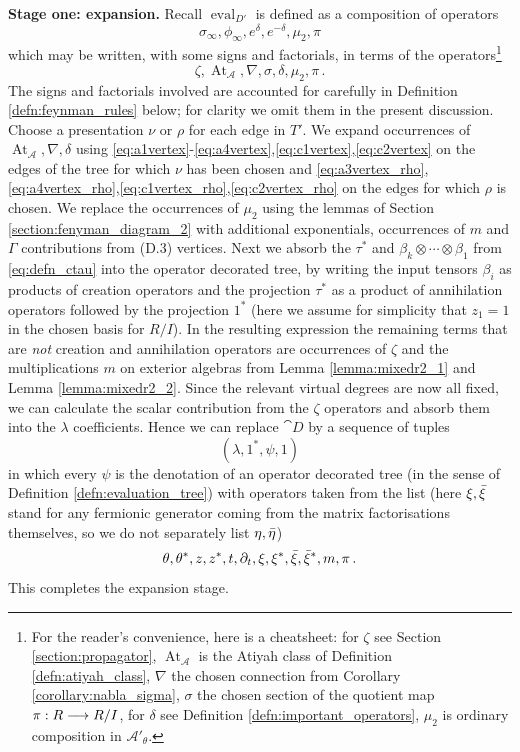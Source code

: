 \documentclass[english,letter paper,12pt,leqno]{article}
\theoremstyle{example}
\numberwithin{equation}{section}
\def\AA{\mathcal{A}}
\def\be{\begin{equation}}
\def\ee{\end{equation}}
\DeclareMathOperator{\vAt}{At}
\begin{document}
\textbf{Stage one: expansion.} Recall $\operatorname{eval}_{D'}$ is defined as a composition of operators
\[
\sigma_\infty, \phi_\infty, e^{\delta}, e^{-\delta}, \mu_2, \pi
\]
which may be written, with some signs and factorials, in terms of the operators\footnote{For the reader's convenience, here is a cheatsheet: for $\zeta$ see Section \ref{section:propagator}, $\vAt_{\AA}$ is the Atiyah class of Definition \ref{defn:atiyah_class}, $\nabla$ the chosen connection from Corollary \ref{corollary:nabla_sigma}, $\sigma$ the chosen section of the quotient map $\pi: R \longrightarrow R/I$, for $\delta$ see Definition \ref{defn:important_operators}, $\mu_2$ is ordinary composition in $\AA'_\theta$.}
\[
\zeta, \vAt_{\AA}, \nabla, \sigma, \delta, \mu_2, \pi\,.
\]
The signs and factorials involved are accounted for carefully in Definition \ref{defn:feynman_rules} below; for clarity we omit them in the present discussion. Choose a presentation $\nu$ or $\rho$ for each edge in $T'$. We expand occurrences of $\vAt_{\AA}, \nabla, \delta$ using \eqref{eq:a1vertex}-\eqref{eq:a4vertex},\eqref{eq:c1vertex},\eqref{eq:c2vertex} on the edges of the tree for which $\nu$ has been chosen and \eqref{eq:a3vertex_rho},\eqref{eq:a4vertex_rho},\eqref{eq:c1vertex_rho},\eqref{eq:c2vertex_rho} on the edges for which $\rho$ is chosen. We replace the occurrences of $\mu_2$ using the lemmas of Section \ref{section:fenyman_diagram_2} with additional exponentials, occurrences of $m$ and $\Gamma$ contributions from (D.3) vertices. Next we absorb the $\tau^*$ and $\beta_k \otimes \cdots \otimes \beta_1$ from \eqref{eq:defn_ctau} into the operator decorated tree, by writing the input tensors $\beta_i$ as products of creation operators and the projection $\tau^*$ as a product of annihilation operators followed by the projection $1^*$ (here we assume for simplicity that $z_1 = 1$ in the chosen basis for $R/I$). In the resulting expression the remaining terms that are \emph{not} creation and annihilation operators are occurrences of $\zeta$ and the multiplications $m$ on exterior algebras from Lemma \ref{lemma:mixedr2_1} and Lemma \ref{lemma:mixedr2_2}. Since the relevant virtual degrees are now all fixed, we can calculate the scalar contribution from the $\zeta$ operators and absorb them into the $\lambda$ coefficients. Hence we can replace $\cat{D}$ by a sequence of tuples
\[
(\lambda, 1^*, \psi, 1)
\]
in which every $\psi$ is the denotation of an operator decorated tree (in the sense of Definition \ref{defn:evaluation_tree}) with operators taken from the list (here $\xi, \Bar{\xi}$ stand for any fermionic generator coming from the matrix factorisations themselves, so we do not separately list $\eta, \Bar{\eta}$)
\be\label{eq:possible_operators}
\theta, \theta^*, z, z^*, t, \partial_t, \xi, \xi^*, \Bar{\xi}, \Bar{\xi}^*, m, \pi\,.
\ee
This completes the expansion stage.
\\
\end{document}
